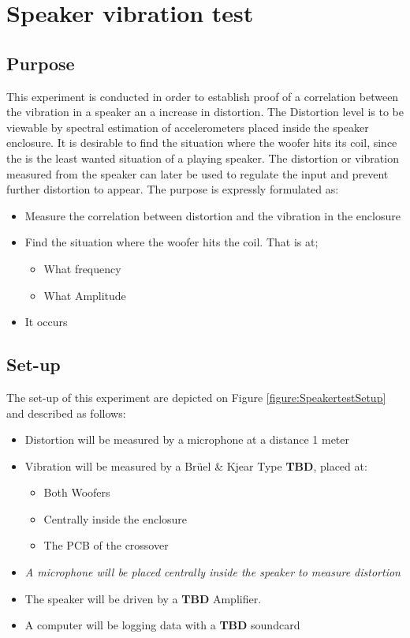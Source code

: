 \chapter{Speaker vibration test}

\section{Purpose}

This experiment is conducted in order to establish proof of a correlation between the vibration in a speaker an a increase in distortion. The Distortion level is to be viewable by spectral estimation of accelerometers placed inside the speaker enclosure. It is desirable to find the situation where the woofer hits its coil, since the is the least wanted situation of a playing speaker. The distortion or vibration measured from the speaker can later be used to regulate the input and prevent further distortion to appear. The purpose is expressly formulated as:
\begin{itemize}
\item Measure the correlation between distortion and the vibration in the enclosure
\item Find the situation where the woofer hits the coil. That is at;
\begin{itemize}
\item What frequency 
\item What Amplitude
\end{itemize}
\item [] It occurs 
\end{itemize}

\section{Set-up}

The set-up of this experiment are depicted on Figure \ref{figure:SpeakertestSetup} and described as follows:
\begin{itemize}
\item Distortion will be measured by a microphone at a distance 1 meter
\item Vibration will be measured by a Brüel \& Kjear Type \textbf{TBD}, placed at:
\begin{itemize}
\item Both Woofers
\item Centrally inside the enclosure 
\item The PCB of the crossover
\end{itemize}
\item \textit{A microphone will be placed centrally inside the speaker to measure distortion}
\item The speaker will be driven by a \textbf{TBD} Amplifier.
\item A computer will be logging data with a \textbf{TBD} soundcard
\end{itemize}


